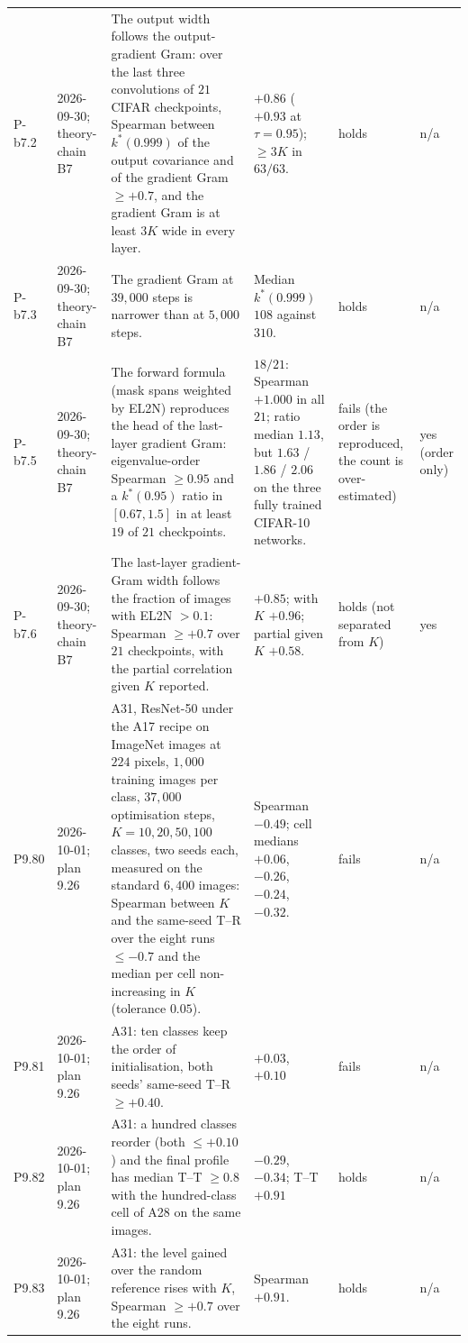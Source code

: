 \begin{longtable}{p{1.1cm}p{1.4cm}p{6.2cm}p{4.6cm}p{2.0cm}p{1.6cm}}
P-b7.2 & 2026-09-30; theory-chain B7 & The output width follows the output-gradient Gram: over the last three convolutions of $21$ CIFAR checkpoints, Spearman between $k^*(0.999)$ of the output covariance and of the gradient Gram $\ge +0.7$, and the gradient Gram is at least $3K$ wide in every layer. & $+0.86$ ($+0.93$ at $\tau = 0.95$); $\ge 3K$ in $63/63$. & holds & n/a \\
P-b7.3 & 2026-09-30; theory-chain B7 & The gradient Gram at $39{,}000$ steps is narrower than at $5{,}000$ steps. & Median $k^*(0.999)$ $108$ against $310$. & holds & n/a \\
P-b7.5 & 2026-09-30; theory-chain B7 & The forward formula (mask spans weighted by EL2N) reproduces the head of the last-layer gradient Gram: eigenvalue-order Spearman $\ge 0.95$ and a $k^*(0.95)$ ratio in $[0.67, 1.5]$ in at least $19$ of $21$ checkpoints. & $18/21$: Spearman $+1.000$ in all $21$; ratio median $1.13$, but $1.63$ / $1.86$ / $2.06$ on the three fully trained CIFAR-10 networks. & fails (the order is reproduced, the count is over-estimated) & yes (order only) \\
P-b7.6 & 2026-09-30; theory-chain B7 & The last-layer gradient-Gram width follows the fraction of images with EL2N $> 0.1$: Spearman $\ge +0.7$ over $21$ checkpoints, with the partial correlation given $K$ reported. & $+0.85$; with $K$ $+0.96$; partial given $K$ $+0.58$. & holds (not separated from $K$) & yes \\
P9.80 & 2026-10-01; plan 9.26 & A31, ResNet-50 under the A17 recipe on ImageNet images at $224$ pixels, $1{,}000$ training images per class, $37{,}000$ optimisation steps, $K = 10, 20, 50, 100$ classes, two seeds each, measured on the standard $6{,}400$ images: Spearman between $K$ and the same-seed T--R over the eight runs $\le -0.7$ and the median per cell non-increasing in $K$ (tolerance $0.05$). & Spearman $-0.49$; cell medians $+0.06$, $-0.26$, $-0.24$, $-0.32$. & fails & n/a \\
P9.81 & 2026-10-01; plan 9.26 & A31: ten classes keep the order of initialisation, both seeds' same-seed T--R $\ge +0.40$. & $+0.03$, $+0.10$ & fails & n/a \\
P9.82 & 2026-10-01; plan 9.26 & A31: a hundred classes reorder (both $\le +0.10$) and the final profile has median T--T $\ge 0.8$ with the hundred-class cell of A28 on the same images. & $-0.29$, $-0.34$; T--T $+0.91$ & holds & n/a \\
P9.83 & 2026-10-01; plan 9.26 & A31: the level gained over the random reference rises with $K$, Spearman $\ge +0.7$ over the eight runs. & Spearman $+0.91$. & holds & n/a \\

\end{longtable}
